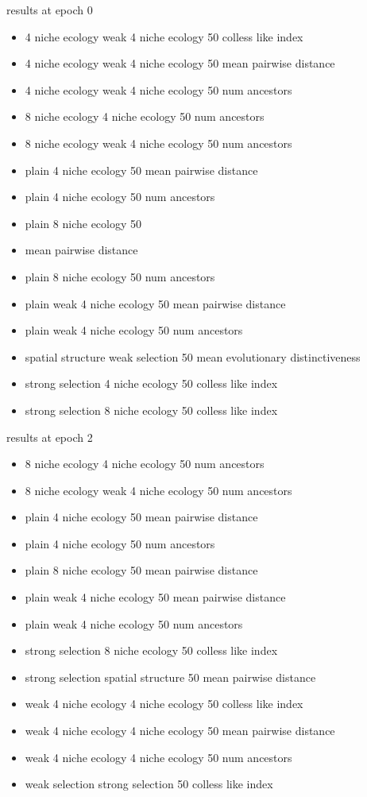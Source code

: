 results at epoch 0
\begin{itemize}
\item 4 niche ecology	weak 4 niche ecology	50	colless like index
\item 4 niche ecology	weak 4 niche ecology	50	mean pairwise distance
\item 4 niche ecology	weak 4 niche ecology	50	num ancestors
\item 8 niche ecology	4 niche ecology	50	num ancestors
\item 8 niche ecology	weak 4 niche ecology	50	num ancestors
\item plain	4 niche ecology	50	mean pairwise distance
\item plain	4 niche ecology	50	num ancestors
\item plain	8 niche ecology	50
\item mean pairwise distance
\item plain	8 niche ecology	50	num ancestors
\item plain	weak 4 niche ecology	50	mean pairwise distance
\item plain	weak 4 niche ecology	50	num ancestors
\item spatial structure	weak selection	50	mean evolutionary distinctiveness
\item strong selection	4 niche ecology	50	colless like index
\item strong selection	8 niche ecology	50	colless like index

\end{itemize}

results at epoch 2
\begin{itemize}
    \item 8 niche ecology	4 niche ecology	50	num ancestors
    \item 8 niche ecology	weak 4 niche ecology	50	num ancestors
    \item plain	4 niche ecology	50	mean pairwise distance
    \item plain	4 niche ecology	50	num ancestors
    \item plain	8 niche ecology	50	mean pairwise distance
    \item plain	weak 4 niche ecology	50	mean pairwise distance
    \item plain	weak 4 niche ecology	50	num ancestors
    \item strong selection	8 niche ecology	50	colless like index
\item strong selection	spatial structure	50	mean pairwise distance
\item weak 4 niche ecology	4 niche ecology	50	colless like index
\item weak 4 niche ecology	4 niche ecology	50	mean pairwise distance
\item weak 4 niche ecology	4 niche ecology	50	num ancestors
\item weak selection	strong selection	50	colless like index

\end{itemize}

